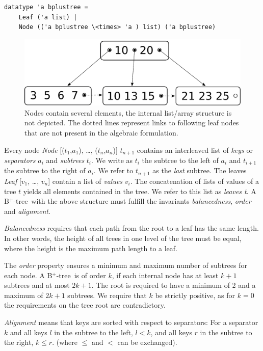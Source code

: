 \documentclass[runningheads]{llncs}
\newcommand{\btree}{B$^+$-tree}
\begin{document}
\begin{lstlisting}[mathescape=true, language=Isabelle,label=lst:btree-def]
datatype 'a bplustree =
    Leaf ('a list) |
    Node (('a bplustree \<times> 'a ) list) ('a bplustree)
\end{lstlisting}

\begin{figure}
    \centering
    \includegraphics[width=0.5\linewidth]{btree-basic-nopair.pdf}
    \caption[Visualization of a \btree]
    {Nodes contain several elements, the internal list/array structure is not depicted.
    The dotted lines represent links to following leaf nodes that are not present in the algebraic formulation.}
    \label{fig:btree-basic}
\end{figure}


Every node \emph{Node} [($t_1$,$a_1$), …, ($t_n$,$a_n$)] $t_{n+1}$ contains an interleaved list of \textit{keys} or \emph{separators} $a_i$ and \textit{subtrees} $t_i$.
We write as $t_i$ the subtree to the left of $a_i$ and
$t_{i+1}$ the subtree to the right of $a_i$.
We refer to $t_{n+1}$ as the \textit{last} subtree.
The leaves \emph{Leaf} [$v_1$, …, $v_n$] contain a list of \textit{values} $v_i$.
The concatenation of lists of values of a tree $t$ yields
all elements contained in the tree. We refer to this list as \emph{leaves t}.
A \btree\ with the above structure must fulfill the invariants
\textit{balancedness}, \textit{order} and \textit{alignment}.

\textit{Balancedness} requires
that each path from the root to a leaf has the same length.
In other words, the height of all trees in one level of the tree must be equal,
where the height is the maximum path length to a leaf.

The \textit{order} property ensures a minimum and maximum
number of subtrees for each node.
A \btree\ is of order $k$, if each internal node has at least $k+1$
subtrees and at most $2k+1$.
The root is required to have a minimum of 2 and a maximum of $2k+1$ subtrees.
We require that $k$ be strictly positive, as for $k = 0$ the requirements on the tree
root are contradictory.

\textit{Alignment} means that keys are sorted with respect to separators:
For a separator $k$ and all keys $l$ in the subtree to the left, $l < k$,
and all keys $r$ in the subtree to the right, $k \leq r$.
(where $\leq$ and $<$ can be exchanged).
\end{document}
